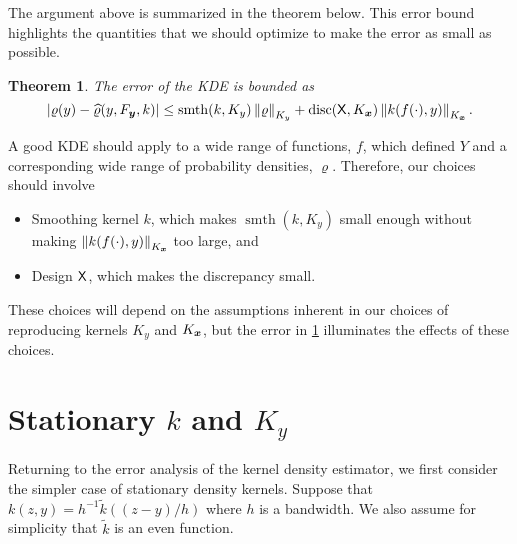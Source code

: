 \documentclass[letterpaper]{amsart}
\newtheorem{theorem}{Theorem}
\newcommand{\hvarrho}{\widehat{\varrho}}
\newcommand{\KY}{K_y}
\newcommand{\KX}{{K_{\vx}}}
\newcommand{\tk}{\tilde{k}}
\DeclareMathOperator{\smooth}{smth}
\DeclareMathOperator{\disc}{disc}
\begin{document}
The argument above is summarized in the theorem below.  This error bound highlights the quantities that we should optimize to make the error as small as possible.
\begin{theorem}\label{thm:errbd} The error of the KDE is bounded as
	\begin{equation}
			\abs{\varrho(y) - \hvarrho(y,F_{\vy},k)} \le \smooth(k,\KY) \norm[\KY]{\varrho} + \disc(\mX,\KX) \norm[\KX]{k(f(\cdot),y)}.
	\end{equation}
\end{theorem}
A good KDE should apply to a wide range of  functions, $f$, which defined $Y$ and a corresponding wide range of probability densities, $\varrho$.  Therefore, our choices should involve
\begin{itemize}
	\item  Smoothing kernel $k$, which makes $\smooth(k,\KY)$ small enough without making $\norm[\KX]{k(f(\cdot),y)}$ too large, and
	\item Design $\mathsf{X}$, which makes the discrepancy small.
\end{itemize}
These choices will depend on the assumptions inherent in our choices of reproducing kernels $\KY$ and $\KX$, but the error in \cref{thm:errbd} illuminates the effects of these choices.



\section{Stationary $k$ and $\KY$}

Returning to the error analysis of the kernel density estimator, we first consider the simpler case of stationary density kernels.  Suppose that $k(z,y) = h^{-1}\tk((z-y)/h)$ where $h$ is a bandwidth. We also assume for simplicity that $\tk$ is an even function.
\end{document}
